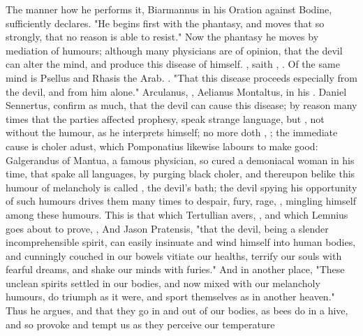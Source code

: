 The manner how he performs it, Biarmannus in his Oration against Bodine,
sufficiently declares. "He begins first with the phantasy,
and moves that so strongly, that no reason is able to resist." Now the phantasy
he moves by mediation of humours; although many physicians are of opinion, that
the devil can alter the mind, and produce this disease of himself.
, saith \Avicenna{}, . Of the same mind is Psellus and Rhasis the
Arab. . "That
this disease proceeds especially from the devil, and from him alone."
Arculanus, , Aelianus Montaltus, in
his . Daniel Sennertus,  confirm as much, that the devil can cause this disease;
by reason many times that the parties affected prophesy, speak strange
language, but , not without the humour, as he
interprets himself; no more doth \Avicenna{}, ; the immediate cause is choler adust, which
Pomponatius likewise labours to make good: Galgerandus of
Mantua, a famous physician, so cured a demoniacal woman in his time, that spake
all languages, by purging black choler, and thereupon belike this humour of
melancholy is called , the devil's bath; the devil spying
his opportunity of such humours drives them many times to despair, fury, rage,
\etc{}, mingling himself among these humours. This is that which Tertullian
avers, , \etc{} and which Lemnius goes about to prove,
, \etc{} And
Jason Pratensis, "that the devil, being a slender
incomprehensible spirit, can easily insinuate and wind himself into human
bodies, and cunningly couched in our bowels vitiate our healths, terrify our
souls with fearful dreams, and shake our minds with furies." And in another
place, "These unclean spirits settled in our bodies, and now mixed with our
melancholy humours, do triumph as it were, and sport themselves as in another
heaven." Thus he argues, and that they go in and out of our bodies, as bees do
in a hive, and so provoke and tempt us as they perceive our temperature
